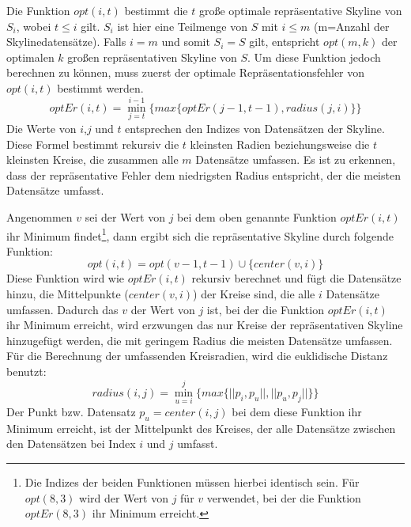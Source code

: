 Die Funktion $opt(i,t)$ bestimmt die $t$ große optimale repräsentative Skyline von $S_i$, wobei $t \leq i$ gilt. $S_i$ ist hier eine Teilmenge von $S$ mit $i \leq m$ (m=Anzahl der Skylinedatensätze). Falls $i=m$ und somit $S_i=S$ gilt, entspricht $opt(m,k)$ der optimalen $k$ großen repräsentativen Skyline von $S$.
Um diese Funktion jedoch berechnen zu können, muss zuerst der optimale Repräsentationsfehler von $opt(i,t)$ bestimmt werden.
$$optEr(i,t)=\min\limits_{j=t}^{i-1}\{max\{optEr(j-1,t-1),radius(j,i)\}\}$$
Die Werte von $i$,$j$ und $t$ entsprechen den Indizes von Datensätzen der Skyline. Diese Formel bestimmt rekursiv die $t$ kleinsten Radien beziehungsweise die $t$ kleinsten Kreise, die zusammen alle $m$ Datensätze umfassen. Es ist zu erkennen, dass der repräsentative Fehler dem niedrigsten Radius entspricht, der die meisten Datensätze umfasst.

Angenommen $v$ sei der Wert von $j$ bei dem oben genannte Funktion $optEr(i,t)$ ihr Minimum findet\footnote{Die Indizes der beiden Funktionen müssen hierbei identisch sein. Für $opt(8,3)$ wird der Wert von $j$ für $v$ verwendet, bei der die Funktion $optEr(8,3)$ ihr Minimum erreicht.}, dann ergibt sich die repräsentative Skyline durch folgende Funktion:
$$opt(i,t)=opt(v-1,t-1)\cup\{center(v,i)\}$$
Diese Funktion wird wie $optEr(i,t)$ rekursiv berechnet und fügt die Datensätze hinzu, die Mittelpunkte ($center(v,i)$) der Kreise sind, die alle $i$ Datensätze umfassen. Dadurch das $v$ der Wert von $j$ ist, bei der die Funktion $optEr(i,t)$ ihr Minimum erreicht, wird erzwungen das nur Kreise der repräsentativen Skyline hinzugefügt werden, die mit geringem Radius die meisten Datensätze umfassen.   
Für die Berechnung der umfassenden Kreisradien, wird die euklidische Distanz benutzt:
$$radius(i,j)=\min\limits_{u=i}^{j}\{max\{||p_i,p_u||,||p_u,p_j||\}\}$$
Der Punkt bzw. Datensatz $p_u=center(i,j)$ bei dem diese Funktion ihr Minimum erreicht, ist der Mittelpunkt des Kreises, der alle Datensätze zwischen den Datensätzen bei Index $i$ und $j$ umfasst.

